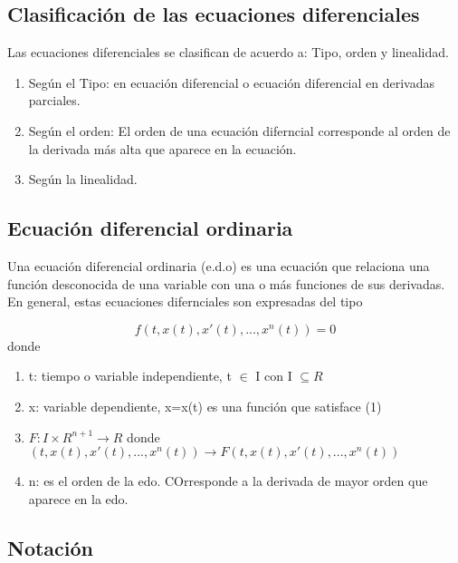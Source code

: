 \documentclass{article}
\begin{document}
    \subsection{Clasificación de las ecuaciones diferenciales}
    Las ecuaciones diferenciales se clasifican de acuerdo a:
    Tipo, orden y linealidad.
    
    \begin{enumerate}
        \item Según el Tipo: en ecuación diferencial o ecuación diferencial en derivadas parciales.
        \item Según el orden: El orden de una ecuación diferncial corresponde al orden de la derivada más alta que aparece en la ecuación.
        \item Según la linealidad.
    \end{enumerate}

    \subsection{Ecuación diferencial ordinaria}
    Una ecuación diferencial ordinaria (e.d.o) es una ecuación que relaciona 
    una función desconocida de una variable con una o más funciones de sus derivadas.
    En general, estas ecuaciones difernciales son expresadas del tipo

    \begin{equation}
        f(t,x(t),x'(t),..., x^{n}(t))=0
    \end{equation}
    donde

    \begin{enumerate}
        \item t: tiempo o variable independiente, t $\in$ I con I $\subseteq  R$
        \item x: variable dependiente, x=x(t) es una función que satisface (1)
        \item $F: I \times R^{n+1} \rightarrow R$ donde\\ 
        $(t,x(t),x'(t),...,x^{n}(t)) \rightarrow  F(t,x(t),x'(t),...,x^{n}(t))$
        \item n: es el orden de la edo. COrresponde a la derivada de mayor orden que aparece 
        en la edo.
    \end{enumerate}

    \subsection{Notación}
\end{document}
